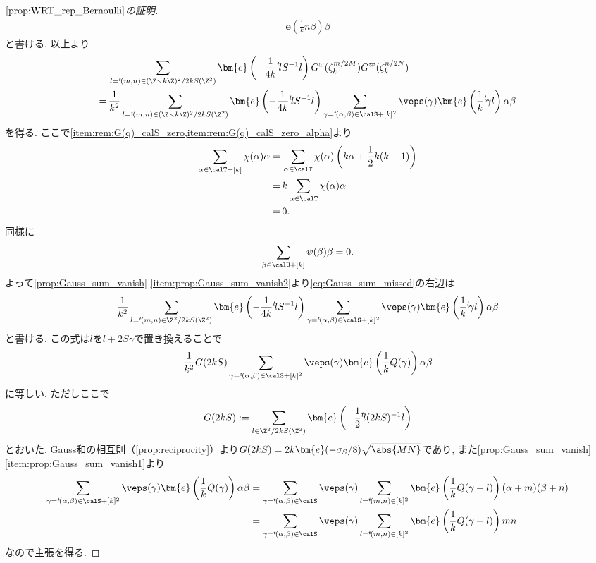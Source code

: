 \documentclass[11pt,b5paper,oneside,lualatex]{ltjsarticle} %
\numberwithin{equation}{section} %
\begin{document}
\begin{proof}[$ \cref{prop:WRT_rep_Bernoulli} $の証明]
\begin{align}
		\bm{e} \left( \frac{1}{k} n \beta \right)
		\beta
	\end{align}
	と書ける. 
	以上より
	\begin{equation} \label{eq:Gauss_sum_missed}
		\begin{aligned}
			&\sum_{l = {}^t\!(m, n) \in (\Z \smallsetminus k\Z)^2/2kS(\Z^2)}
			\bm{e} \left( -\frac{1}{4k} {}^t\!l S^{-1} l \right)
			G^\omega(\zeta_k^{m/2M}) G^\varpi(\zeta_k^{n/2N}) \\
			= \,
			&\frac{1}{k^2}
			\sum_{l = {}^t\!(m, n) \in (\Z \smallsetminus k\Z)^2/2kS(\Z^2)}
			\bm{e} \left( -\frac{1}{4k} {}^t\!l S^{-1} l \right)
			\sum_{\gamma = {}^t\!(\alpha, \beta) \in \calS + [k]^2}
			\veps(\gamma) \bm{e}\left( \frac{1}{k} {}^t\!\gamma l \right)
			\alpha \beta
		\end{aligned}		
	\end{equation}
	を得る. 	
	ここで\cref{item:rem:G(q)_calS_zero,item:rem:G(q)_calS_zero_alpha}より
	\begin{align}
		\sum_{\alpha \in \calT + [k]} \chi(\alpha) \alpha
		= \,
		&\sum_{\alpha \in \calT} \chi(\alpha) \left( k\alpha + \frac{1}{2}k(k-1) \right) \\
		= \,
		&k \sum_{\alpha \in \calT} \chi(\alpha) \alpha \\
		= \,
		&0.
	\end{align}
	同様に
	\[
	\sum_{\beta \in \calU + [k]} \psi(\beta) \beta
	= 0.
	\]
	よって\cref{prop:Gauss_sum_vanish} \cref{item:prop:Gauss_sum_vanish2}より\cref{eq:Gauss_sum_missed}の右辺は
	\begin{align} 
		\frac{1}{k^2}
		\sum_{l = {}^t\!(m, n) \in \Z^2/2kS(\Z^2)}
		\bm{e} \left( -\frac{1}{4k} {}^t\!l S^{-1} l \right)
		\sum_{\gamma = {}^t\!(\alpha, \beta) \in \calS + [k]^2}
		\veps(\gamma) \bm{e}\left( \frac{1}{k} {}^t\!\gamma l \right)
		\alpha \beta
	\end{align}
	と書ける. 
	この式は$ l $を$ l + 2S\gamma $で置き換えることで
	\begin{align} 
		\frac{1}{k^2} G(2kS)
		\sum_{\gamma = {}^t\!(\alpha, \beta) \in \calS + [k]^2}
		\veps(\gamma) \bm{e}\left( \frac{1}{k} Q(\gamma) \right)
		\alpha \beta
	\end{align}
	に等しい.
	ただしここで
	\[
	G(2kS) :=
	\sum_{l \in \Z^2/2kS(\Z^2)}
	\bm{e} \left( -\frac{1}{2} {}^t\!l (2kS)^{-1} l \right)
	\]
	とおいた. 
	Gauss和の相互則（\cref{prop:reciprocity}）より$ G(2kS) = 2k \bm{e} (-\sigma_S/8) \sqrt{\abs{MN}} $であり, また\cref{prop:Gauss_sum_vanish} \cref{item:prop:Gauss_sum_vanish1}より
	\begin{align} 
		\sum_{\gamma = {}^t\!(\alpha, \beta) \in \calS + [k]^2}
		\veps(\gamma) \bm{e}\left( \frac{1}{k} Q(\gamma) \right)
		\alpha \beta
		&=
		\sum_{\gamma = {}^t\!(\alpha, \beta) \in \calS} 
		\veps(\gamma)
		\sum_{l = {}^t\!(m, n) \in [k]^2}
		\bm{e}\left( \frac{1}{k} Q(\gamma + l) \right) (\alpha + m)(\beta + n)
		\\
		&=
		\sum_{\gamma = {}^t\!(\alpha, \beta) \in \calS} 
		\veps(\gamma)
		\sum_{l = {}^t\!(m, n) \in [k]^2}
		\bm{e}\left( \frac{1}{k} Q(\gamma + l) \right) mn
	\end{align}
	なので主張を得る. 
\end{proof}
\end{document}
